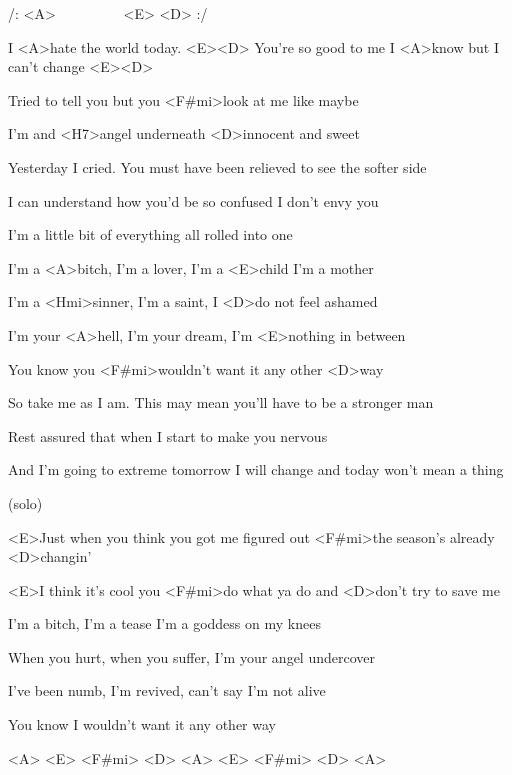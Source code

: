 
/: <A>~~~~~~~~~ <E> <D> :/

\zs
I <A>hate the world today. <E><D>
You're so good to me I
<A>know but I can't change <E><D>

Tried to tell you but you <F#mi>look at me like maybe

I'm and <H7>angel underneath <D>innocent and sweet
 \ks

\zs
Yesterday I cried. You must have been relieved to see the softer side

I can understand how you'd be so confused I don't envy you

I'm a little bit of everything all rolled into one
\ks

\zr
I'm a <A>bitch, I'm a lover, I'm a <E>child I'm a mother

I'm a <Hmi>sinner, I'm a saint, I <D>do not feel ashamed

I'm your <A>hell, I'm your dream, I'm <E>nothing in between

You know you <F#mi>wouldn't want it any other <D>way
\kr

\zs
So take me as I am. This may mean you'll have to be a stronger man

Rest assured that when I start to make you nervous

And I'm going to extreme tomorrow I will change and today won't mean a thing
\ks

\zr

\kr

\zr (solo) \kr

<E>Just when you think you got me figured out <F#mi>the season's 
already <D>changin'

<E>I think it's cool you <F#mi>do what ya do and <D>don't try 
to save me

\zr
\kr

\zr
I'm a bitch, I'm a tease I'm a goddess on my knees

When you hurt, when you suffer, I'm your angel undercover

I've been numb, I'm revived, can't say I'm not alive

You know I wouldn't want it any other way
\kr

<A> <E> <F#mi> <D> 
<A> <E> <F#mi> <D> 
<A>

\kp

